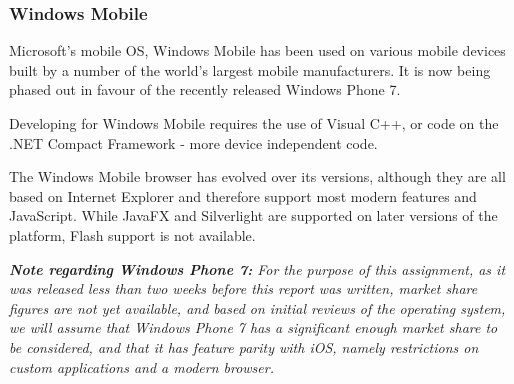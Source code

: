 \documentclass[a4papert,11pt,notitlepage]{ltxdoc}
\begin{document}
\subsubsection{Windows Mobile}
Microsoft's mobile OS, Windows Mobile has been used on various mobile devices built by a number of the world's largest mobile manufacturers. It is now being phased out in favour of the recently released Windows Phone 7.

Developing for Windows Mobile requires the use of Visual C++, or code on the .NET Compact Framework - more device independent code.

The Windows Mobile browser has evolved over its versions, although they are all based on Internet Explorer and therefore support most modern features and JavaScript. While JavaFX and Silverlight are supported on later versions of the platform, Flash support is not available.

{\it{\bf Note regarding Windows Phone 7:} For the purpose of this assignment, as it was released less than two weeks before this report was written, market share figures are not yet available, and based on initial reviews of the operating system, we will assume that Windows Phone 7 has a significant enough market share to be considered, and that it has feature parity with iOS, namely restrictions on custom applications and a modern browser.}


\end{document}
